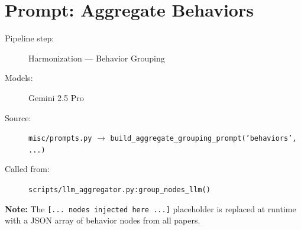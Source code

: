 \section*{Prompt: Aggregate Behaviors}
\begin{description}
\item[Pipeline step:] Harmonization --- Behavior Grouping
\item[Models:] Gemini 2.5 Pro
\item[Source:] \texttt{misc/prompts.py} $\rightarrow$ \texttt{build\_aggregate\_grouping\_prompt('behaviors', ...)}
\item[Called from:] \texttt{scripts/llm\_aggregator.py:group\_nodes\_llm()}
\end{description}
\begin{tcolorbox}[colback=yellow!8,colframe=yellow!50!black,left=4pt,right=4pt,top=4pt,bottom=4pt,arc=2pt]
\textbf{Note:} The \texttt{[... nodes injected here ...]} placeholder is replaced at runtime with a JSON array of behavior nodes from all papers.
\end{tcolorbox}


